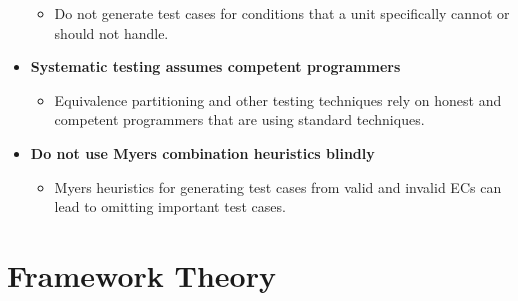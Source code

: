 \documentclass[11pt]{article}
\providecommand{\tightlist}{%
      \setlength{\itemsep}{0pt}\setlength{\parskip}{0pt}}
\begin{document}
\begin{itemize}
  \begin{itemize}
  \tightlist
  \item
    Do not generate test cases for conditions that a unit specifically
    cannot or should not handle.
  \end{itemize}
\item
  \textbf{Systematic testing assumes competent programmers}

  \begin{itemize}
  \tightlist
  \item
    Equivalence partitioning and other testing techniques rely on honest
    and competent programmers that are using standard techniques.
  \end{itemize}
\item
  \textbf{Do not use Myers combination heuristics blindly}

  \begin{itemize}
  \tightlist
  \item
    Myers heuristics for generating test cases from valid and invalid
    ECs can lead to omitting important test cases.
  \end{itemize}
\end{itemize}

    \hypertarget{framework-theory}{%
\section{Framework Theory}\label{framework-theory}}
\end{document}
